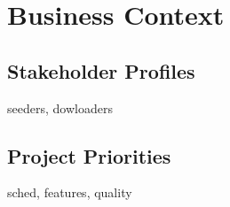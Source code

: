 \documentclass[letter]{scrartcl}
\begin{document}


\section{Business Context}
\subsection{Stakeholder Profiles}
seeders, dowloaders

\subsection{Project Priorities}
sched, features, quality
\end{document}
